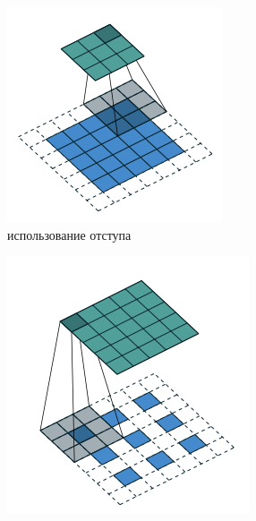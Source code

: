 \documentclass[12pt, fleqn]{article}
\begin{document}
    \begin{figure}[ht]
        \centering
        \begin{subfigure}[b]{0.33\textwidth}
            \centering
            \includegraphics[width=\linewidth]{pics/padding.png}
            \caption{использование отступа}
        \end{subfigure}
        \begin{subfigure}[b]{0.33\textwidth}
            \centering
            \includegraphics[width=\linewidth]{pics/stride.png}

\end{subfigure}
\end{figure}
\end{document}
